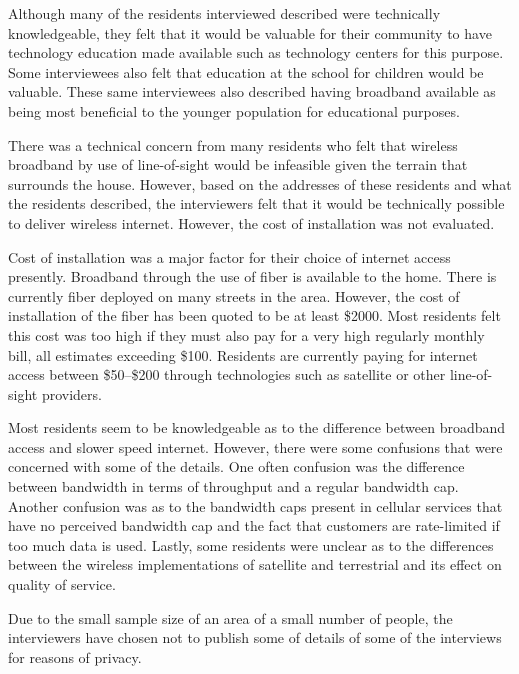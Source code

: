 Although many of the residents interviewed described were technically knowledgeable, they felt
that it would be valuable for their community to have technology education made available such
as technology centers for this purpose. Some interviewees also felt that education at the school
for children would be valuable. These same interviewees also described having broadband available
as being most beneficial to the younger population for educational purposes.

There was a technical concern from many residents who felt that wireless broadband by use of
line-of-sight would be infeasible given the terrain that surrounds the house. However, based
on the addresses of these residents and what the residents described, the interviewers felt
that it would be technically possible to deliver wireless internet. However, the cost of
installation was not evaluated.

Cost of installation was a major factor for their choice of internet access presently. Broadband
through the use of fiber is available to the home. There is currently fiber deployed on many
streets in the area. However, the cost of installation of the fiber has been quoted to be at least \$2000.
Most residents felt this cost was too high if they must also pay for a very high regularly monthly bill, all
estimates exceeding \$100. Residents are currently paying for internet access between \$50--\$200
through technologies such as satellite or other line-of-sight providers.

Most residents seem to be knowledgeable as to the difference between broadband access and slower speed internet.
However, there were some confusions that were concerned with some of the details. One often confusion was
the difference between bandwidth in terms of throughput and a regular bandwidth cap. Another confusion was
as to the bandwidth caps present in cellular services that have no perceived bandwidth cap and the fact that
customers are rate-limited if too much data is used. Lastly, some residents were unclear as to the differences
between the wireless implementations of satellite and terrestrial and its effect on quality of service.

Due to the small sample size of an area of a small number of people,
the interviewers have chosen not to publish some of details of some of the
interviews for reasons of privacy.


